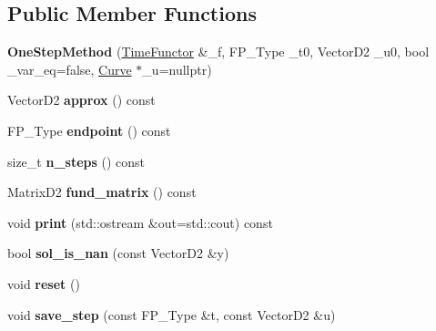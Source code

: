 \subsection*{Public Member Functions}
\begin{DoxyCompactItemize}
\item 
\mbox{\label{classOneStepMethod_a513ea3b2bd015bd266f9cb3e69e00327}} 
{\bfseries One\+Step\+Method} (\hyperlink{classTimeFunctor}{Time\+Functor} \&\+\_\+f, F\+P\+\_\+\+Type \+\_\+t0, Vector\+D2 \+\_\+u0, bool \+\_\+var\+\_\+eq=false, \hyperlink{classCurve}{Curve} $\ast$\+\_\+u=nullptr)
\item 
\mbox{\label{classOneStepMethod_a5f4529edf5aae96d1dd0061b7a798e4f}} 
Vector\+D2 {\bfseries approx} () const
\item 
\mbox{\label{classOneStepMethod_a5fa1efcb274907b97f31cfbbb0c5dc07}} 
F\+P\+\_\+\+Type {\bfseries endpoint} () const
\item 
\mbox{\label{classOneStepMethod_a7ae5bcaf0c1e48551456a6f0835414d2}} 
size\+\_\+t {\bfseries n\+\_\+steps} () const
\item 
\mbox{\label{classOneStepMethod_ad59a0fce9906ba9159da74aea44b3431}} 
Matrix\+D2 {\bfseries fund\+\_\+matrix} () const
\item 
\mbox{\label{classOneStepMethod_aa3fc1d095086c736ef23c60e56034474}} 
void {\bfseries print} (std\+::ostream \&out=std\+::cout) const
\item 
\mbox{\label{classOneStepMethod_ad5e6154e9cc700056474c1c6128e3e9f}} 
bool {\bfseries sol\+\_\+is\+\_\+nan} (const Vector\+D2 \&y)
\item 
\mbox{\label{classOneStepMethod_a4e6743b0343a6c5bb75e423649915b86}} 
void {\bfseries reset} ()
\item 
\mbox{\label{classOneStepMethod_a511d73f8ac7ba27a4e0289b70be7ffad}} 
void {\bfseries save\+\_\+step} (const F\+P\+\_\+\+Type \&t, const Vector\+D2 \&u)
\item 
\mbox{\label{classOneStepMethod_aee957997a620c414ebb999df49debf5b}} 

\end{DoxyCompactItemize}
